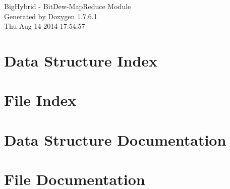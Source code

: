 \documentclass[a4paper]{book}
\begin{document}
\hypersetup{pageanchor=false,citecolor=blue}
\begin{titlepage}
\vspace*{7cm}
\begin{center}
{\Large \-Big\-Hybrid -\/ \-Bit\-Dew-\/\-Map\-Reduce \-Module }\\
\vspace*{1cm}
{\large \-Generated by Doxygen 1.7.6.1}\\
\vspace*{0.5cm}
{\small Thu Aug 14 2014 17:54:57}\\
\end{center}
\end{titlepage}
\clearemptydoublepage
{}
\tableofcontents
\clearemptydoublepage
{}
\hypersetup{pageanchor=true,citecolor=blue}
\chapter{\-Data \-Structure \-Index}

\chapter{\-File \-Index}

\chapter{\-Data \-Structure \-Documentation}







\chapter{\-File \-Documentation}











\printindex
\end{document}
